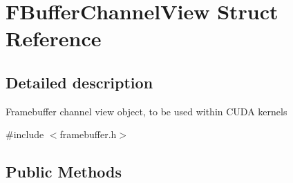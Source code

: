 \hypertarget{struct_f_buffer_channel_view}{}\section{F\+Buffer\+Channel\+View Struct Reference}
\label{struct_f_buffer_channel_view}


\subsection{Detailed description}
Framebuffer channel view object, to be used within C\+U\+DA kernels 

{\ttfamily \#include $<$framebuffer.\+h$>$}

\subsection*{Public Methods}
